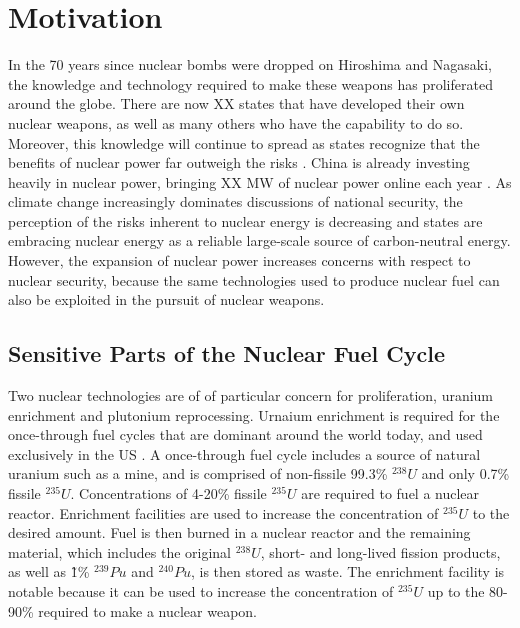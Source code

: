 \section{Motivation}
\label{s_motive}

In the 70 years since nuclear bombs were dropped on Hiroshima and Nagasaki, the knowledge and technology required to make these weapons has proliferated around the globe. There are now XX states that have developed their own nuclear weapons, as well as many others who have the capability to do so\cite{weapons_states}.  Moreover, this knowledge will continue to spread as states recognize that the benefits of nuclear power far outweigh the risks \cite{benefits_of_nuc_power}.  China is already investing heavily in nuclear power,  bringing XX MW of nuclear power online each year  \cite{power_stats}.  As climate change increasingly dominates discussions of national security, the perception of the risks inherent to nuclear energy is decreasing and states are embracing nuclear energy as a reliable large-scale source of carbon-neutral energy.  However, the expansion of nuclear power increases concerns with respect to nuclear security, because the same technologies used to produce nuclear fuel can also be exploited in the pursuit of nuclear weapons.


\subsection{Sensitive Parts of the Nuclear Fuel Cycle}

Two nuclear technologies are of of particular concern for proliferation, uranium enrichment and plutonium reprocessing.  Urnaium enrichment is required for the once-through fuel cycles that are dominant around the world today, and used exclusively in the US \cite{us_reprocessing???}.  A once-through fuel cycle includes a source of natural uranium such as a mine, and is comprised of non-fissile 99.3\% $^{238}U$ and only 0.7\% fissile $^{235}U$. Concentrations of 4-20\% fissile $^{235}U$ are required to fuel a nuclear reactor. Enrichment facilities are used to increase the concentration of $^{235}U$ to the desired amount.  Fuel is then burned in a nuclear reactor and the remaining material, which includes the original $^{238}U$, short- and long-lived fission products, as well as \~1\% $^{239}Pu$ and $^{240}Pu$, is then stored as waste.  The enrichment facility is notable because it can be used to increase the concentration of $^{235}U$ up to the 80-90\% required to make a nuclear weapon\cite{weapons_grade_den}.

